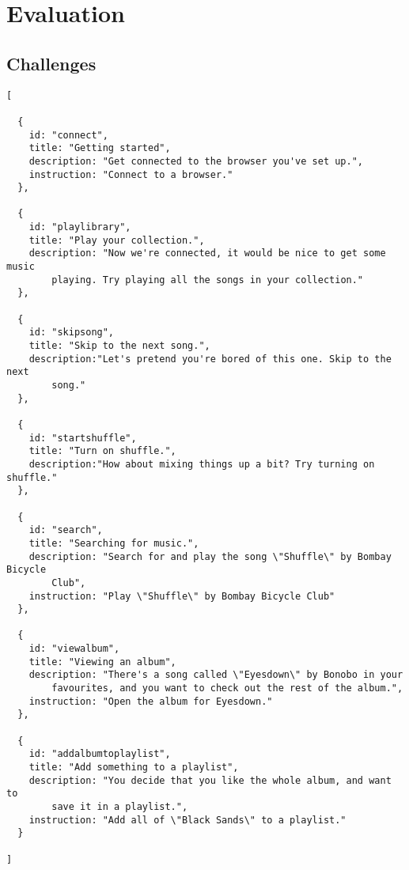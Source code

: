 \chapter{Evaluation} \label{apdx:evaluation}

\section{Challenges}

\begin{verbatim} 
[

  {
    id: "connect", 
    title: "Getting started",
    description: "Get connected to the browser you've set up.",
    instruction: "Connect to a browser."
  },

  {
    id: "playlibrary",
    title: "Play your collection.",
    description: "Now we're connected, it would be nice to get some music
        playing. Try playing all the songs in your collection."
  },
  
  {
    id: "skipsong",
    title: "Skip to the next song.",
    description:"Let's pretend you're bored of this one. Skip to the next
        song."
  },
  
  {
    id: "startshuffle",
    title: "Turn on shuffle.",
    description:"How about mixing things up a bit? Try turning on shuffle."
  },
  
  {
    id: "search",
    title: "Searching for music.",
    description: "Search for and play the song \"Shuffle\" by Bombay Bicycle
        Club",
    instruction: "Play \"Shuffle\" by Bombay Bicycle Club"
  },
  
  {
    id: "viewalbum",
    title: "Viewing an album",
    description: "There's a song called \"Eyesdown\" by Bonobo in your
        favourites, and you want to check out the rest of the album.",
    instruction: "Open the album for Eyesdown."
  },
  
  {
    id: "addalbumtoplaylist",
    title: "Add something to a playlist",
    description: "You decide that you like the whole album, and want to
        save it in a playlist.",
    instruction: "Add all of \"Black Sands\" to a playlist."
  }

] 
\end{verbatim}
